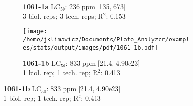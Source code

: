 \documentclass{article}
\begin{document}
\begin{figure}[thp!]
\begin{subfigure}{0.500\textwidth}
      \vspace{-0.05cm}
      \caption*{\textbf{1061-1a} LC$_{50}$: 236 ppm [135, 673] \\ 
3 biol. reps; 3 tech. reps; R$^2$: 0.153}
      \vspace{0.1cm}
   \end{subfigure}%
   \begin{subfigure}{0.500\textwidth}
      \centering
      \texttt{[image: /home/jklimavicz/Documents/Plate\_Analyzer/examples/stats/output/images/pdf/1061-1b.pdf]}
      \vspace{-0.05cm}
      \caption*{\textbf{1061-1b} LC$_{50}$: 833 ppm [21.4, 4.90e23] \\ 
1 biol. rep; 1 tech. rep; R$^2$: 0.413}
      \vspace{0.1cm}
   \end{subfigure}%
\end{figure}
\clearpage
\pagebreak
\vspace{-0.1cm}
\end{document}
